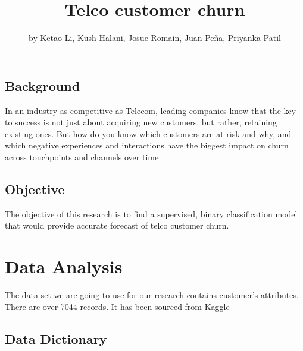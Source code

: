 \title{Telco customer churn}
\author{by Ketao Li, Kush Halani, Josue Romain, Juan Peña, Priyanka Patil}

\maketitle


\hypertarget{background}{%
\subsection{Background}\label{background}}

In an industry as competitive as Telecom, leading companies know that
the key to success is not just about acquiring new customers, but
rather, retaining existing ones. But how do you know which customers are
at risk and why, and which negative experiences and interactions have
the biggest impact on churn across touchpoints and channels over time

\hypertarget{objective}{%
\subsection{Objective}\label{objective}}

The objective of this research is to find a supervised, binary
classification model that would provide accurate forecast of telco
customer churn.

\hypertarget{data-analysis}{%
\section{Data Analysis}\label{data-analysis}}

The data set we are going to use for our research contains customer's
attributes. There are over 7044 records. It has been sourced from
\href{https://www.kaggle.com/blastchar/telco-customer-churn}{Kaggle}

\hypertarget{data-dictionary}{%
\subsection{Data Dictionary}\label{data-dictionary}}

